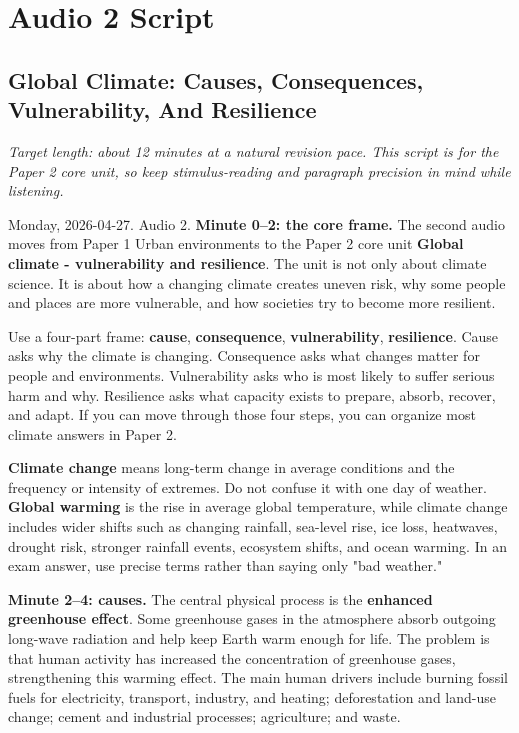 \documentclass[11pt,a4paper]{article}
\newcommand{\term}[1]{\textcolor{HeadingBlue}{\textbf{#1}}}
\begin{document}
\section{Audio 2 Script}
\subsection{Global Climate: Causes, Consequences, Vulnerability, And Resilience}

\textit{Target length: about 12 minutes at a natural revision pace. This script
is for the Paper 2 core unit, so keep stimulus-reading and paragraph precision
in mind while listening.}

Monday, 2026-04-27. Audio 2. \textbf{Minute 0--2: the core frame.}
The second audio moves from Paper 1 Urban environments to the Paper 2 core unit
\term{Global climate - vulnerability and resilience}. The unit is not only
about climate science. It is about how a changing climate creates uneven risk,
why some people and places are more vulnerable, and how societies try to become
more resilient.

Use a four-part frame: \term{cause}, \term{consequence}, \term{vulnerability},
\term{resilience}. Cause asks why the climate is changing. Consequence asks
what changes matter for people and environments. Vulnerability asks who is most
likely to suffer serious harm and why. Resilience asks what capacity exists to
prepare, absorb, recover, and adapt. If you can move through those four steps,
you can organize most climate answers in Paper 2.

\term{Climate change} means long-term change in average conditions and the
frequency or intensity of extremes. Do not confuse it with one day of weather.
\term{Global warming} is the rise in average global temperature, while climate
change includes wider shifts such as changing rainfall, sea-level rise, ice
loss, heatwaves, drought risk, stronger rainfall events, ecosystem shifts, and
ocean warming. In an exam answer, use precise terms rather than saying only "bad
weather."

\textbf{Minute 2--4: causes.}
The central physical process is the \term{enhanced greenhouse effect}. Some
greenhouse gases in the atmosphere absorb outgoing long-wave radiation and help
keep Earth warm enough for life. The problem is that human activity has
increased the concentration of greenhouse gases, strengthening this warming
effect. The main human drivers include burning fossil fuels for electricity,
transport, industry, and heating; deforestation and land-use change; cement and
industrial processes; agriculture; and waste.
\end{document}
